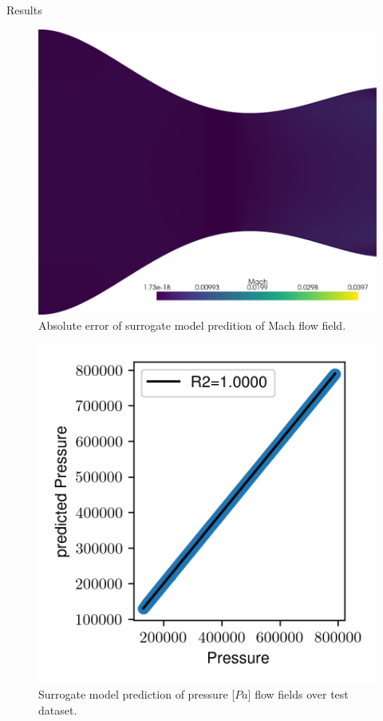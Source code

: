 \begin{frame}{Results}
\begin{figure}
\hypertarget{fig:error_mach}{%
\centering
\includegraphics{figures/Mach_field_error.png}
\caption{Absolute error of surrogate model predition of Mach flow
field.}\label{fig:error_mach}
}
\end{figure}

\begin{figure}
\hypertarget{fig:r2_pressure}{%
\centering
\includegraphics{figures/results/Pressure.png}
\caption{Surrogate model prediction of pressure {[}\(Pa\){]} flow fields
over test dataset.}\label{fig:r2_pressure}
}
\end{figure}


\end{frame}
